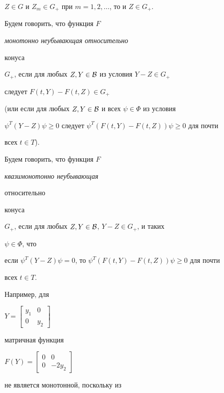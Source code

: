 $Z\in G$ и $Z_m\in G_+$ при $m=1,2,\dotsc$, то и $Z\in G_+$. 


 


\begin{defn} 


Будем говорить, что функция $F$ {\it монотонно неубывающая относительно 


конуса} $G_+$, если для любых $Z,Y\in\cal B$ из условия $Y-Z\in G_+$ 


следует $F(t,Y)-F(t,Z)\in G_+$ 


(или если для любых $Z,Y\in\cal B$ и всех $\psi\in\Phi$ из условия 


$\psi^T(Y-Z)\psi\ge0$ следует $\psi^T(F(t,Y)-F(t,Z))\psi\ge0$ для почти 


всех $t\in T$). 


\end{defn} 


 


\begin{defn} 


Будем говорить, что функция $F$ {\it квазимонотонно неубывающая 


относительно 


конуса} $G_+$, если для любых $Z,Y\in\cal B$, $Y-Z\in G_+$, и таких 


$\psi\in\Phi$, что 


если $\psi^T(Y-Z)\psi=0$, то $\psi^T(F(t,Y)-F(t,Z))\psi\ge0$ для почти 


всех $t\in T$. 


\end{defn} 


 


Например, для 


$Y=\begin{bmatrix} 


y_1 & 0 \\ 0 & y_2 


\end{bmatrix}$ 


матричная функция 


$F(Y)= 


\begin{bmatrix} 


0 & 0 \\ 0 & -2y_2 


\end{bmatrix}$ 


не является монотонной, поскольку из 


